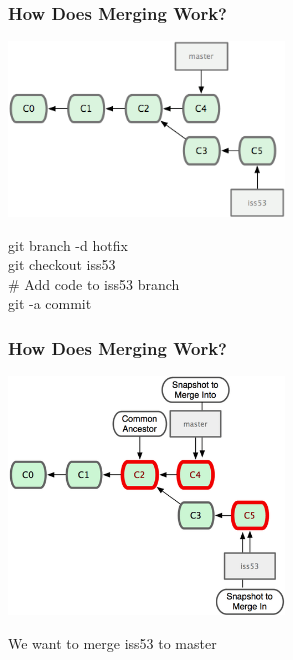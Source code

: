 \begin{frame}
\frametitle{\large How Does Merging Work?}
\begin{center}
\includegraphics[width=0.55\textwidth]{img/branching_images/f6.png}
\end{center}
\vspace{2mm}
\begin{center}
\small git branch -d hotfix \\
\small git checkout iss53 \\
\small \# Add code to iss53 branch \\
\small git -a commit
\end{center}
\end{frame}
\note{}

\begin{frame}
\frametitle{\large How Does Merging Work?}
\begin{center}
\includegraphics[width=0.55\textwidth]{img/branching_images/f7.png}
\end{center}
\vspace{2mm}
\begin{center}
We want to merge iss53 to master
\end{center}
\end{frame}
\note{}


